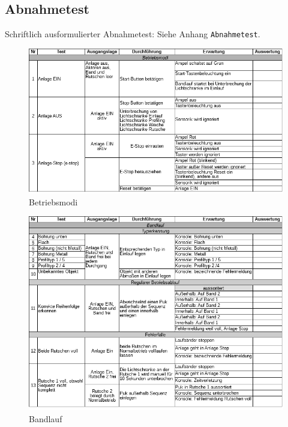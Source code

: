 \documentclass[
   draft=false
  ,paper=a4
  ,twoside=true
  ,fontsize=11pt
  ,headsepline
  ,DIV11
  ,parskip=full+
]{scrartcl} %
\begin{document}
\subsection{Abnahmetest}
Schriftlich ausformulierter Abnahmetest: Siehe Anhang \texttt{Abnahmetest}.
\begin{figure}[H]
	\centering
	\includegraphics[width=1.0\linewidth]{./IMG/Betriebsmodi}
	\caption{Betriebsmodi}
	\label{fig:betriebsmodi}
\end{figure}

\begin{figure}[H]
	\centering
	\includegraphics[width=1.0\linewidth]{./IMG/Bandlauf}
	\caption{Bandlauf}
	\label{fig:bandlauf}
\end{figure}
\end{document}
